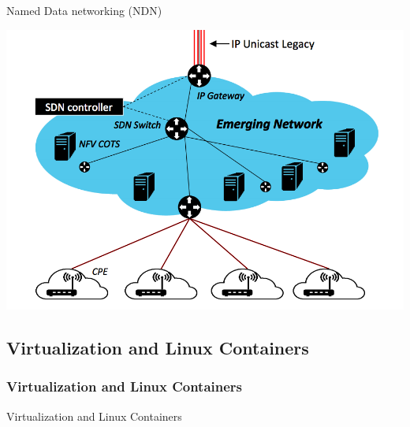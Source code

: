 \documentclass[8pt]{beamer}
\newcommand{\1}{\mathbbm 1}
\begin{document}
\begin{frame}{Named Data networking (NDN)}
{\begin{itemize}
\begin{itemize}
\begin{center}
\includegraphics[scale=0.28]{figures/sdn.png}
\end{center}



\end{itemize}
\end{itemize} 
}




\end{frame}





\subsection{Virtualization and Linux Containers}

\subsubsection{Virtualization and Linux Containers}

\begin{frame}{Virtualization and Linux Containers}

\end{frame}
\end{document}
